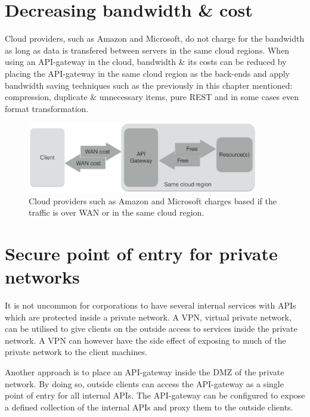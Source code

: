 \documentclass{cslthse-msc}
\begin{document}
\section{Decreasing bandwidth \& cost}
Cloud providers, such as Amazon\cite{cloud_amazon} and Microsoft\cite{cloud_microsoft}, do not charge for the bandwidth as long as data is transfered between servers in the same cloud regions. When using an API-gateway in the cloud, bandwidth \& its costs can be reduced by placing the API-gateway in the same cloud region as the back-ends and apply bandwidth saving techniques such as the previously in this chapter mentioned: compression, duplicate \& unnecessary items, pure REST and in some cases even format transformation.

\begin{figure}[H]
  \centering
    \begin{center}
      \includegraphics[width=0.9\textwidth]{images/api_gateway_bandwidth.png}
    \end{center}
  \caption{Cloud providers such as Amazon\cite{cloud_amazon} and Microsoft\cite{cloud_microsoft} charges based if the traffic is over WAN or in the same cloud region.}
\end{figure}

\section{Secure point of entry for private networks}
It is not uncommon for corporations to have several internal services with APIs which are protected inside a private network. A VPN, virtual private network, can be utilised to give clients on the outside access to services inside the private network. A VPN can however have the side effect of exposing to much of the private network to the client machines.

Another approach is to place an API-gateway inside the DMZ of the private network. By doing so, outside clients can access the API-gateway as a single point of entry for all internal APIs. The API-gateway can be configured to expose a defined collection of the internal APIs and proxy them to the outside clients.
\end{document}
